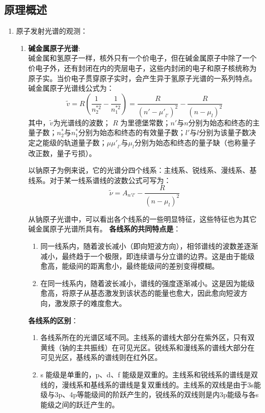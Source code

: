 \documentclass[dvipsnames, svgnames,a4paper,11pt]{article}
\begin{document}
\subsection{原理概述}

		\begin{enumerate}
		\item 原子发射光谱的观测：
			\begin{enumerate}
				\item \textbf{碱金属原子光谱}:\\
					碱金属和氢原子一样，核外只有一个价电子，但在碱金属原子中除了一个价电子外，还有封闭在内的壳层电子，这些内封闭的电子和原子核统称为原子实。当价电子贯穿原子实时，会产生异于氢原子光谱的一系列特点。碱金属原子光谱线公式为：
					\[
					\widetilde{v}=R(\frac{1}{n_2^{*2}}-\frac{1}{n_1^{*2}})=\frac{R}{{(n'-{\mu'}_{l'})}^2}-\frac{R}{{(n-\mu_l)}^2}
					\]
					其中，$\widetilde{v}$为光谱线的波数； $R$ 为里德堡常数；$n'$与$n$分别为始态和终态的主量子数；$n_2^{*}$与$n_1^{*}$分别为始态和终态的有效量子数；$l′$与$l$分别为该量子数决定之能级的轨道量子数；$𝜇{\mu'}_{l'}$与$\mu_l$分别为始态和终态的量子缺（也称量子改正数，量子亏损）。
					
					以钠原子为例来说，它的光谱分四个线系：主线系、锐线系、漫线系、基线系。对于某一线系谱线的波数公式可写为：
					\[\tilde{\nu} = A_{n'l'}-\dfrac{R}{(n-\mu_{l})^2}\]
					
					从钠原子光谱中，可以看出各个线系的一些明显特征，这些特征也为其它碱金属原子光谱所具有。
					\textbf{各线系的共同特点是}：
						\begin{enumerate}
							\item 同一线系内，随着波长减小（即向短波方向），相邻谱线的波数差逐渐减小，最终趋于一个极限，即连续谱与分立谱的边界。这是由于能级愈高，能级间的距离愈小，最终能级间的差别变得模糊。
							
							\item 在同一线系内，随着波长减小，谱线的强度逐渐减小。这是因为能级愈高，将原子从基态激发到该状态的能量也愈大，因此愈向短波方向，激发原子的难度愈大。
						\end{enumerate}
					\textbf{各线系的区别}：
						\begin{enumerate}
							\item 各线系所在的光谱区域不同。主线系的谱线大部分在紫外区，只有双黄线（钠的主共振线）在可见光区。锐线系和漫线系的谱线大部分在可见光区，基线系的谱线则在红外区。
							
							\item s 能级是单重的，p、d、f 能级是双重的。主线系和锐线系的谱线是双线的，漫线系和基线系的谱线是复双重线的。主线系的双线是由于3s能级与3p、4p等能级间的阶跃产生的，锐线系的双线则是内3p能级与各s能级之间的跃迁产生的。
							

\end{enumerate}
\end{enumerate}
\end{enumerate}
\end{document}
